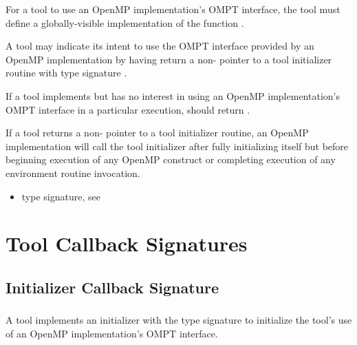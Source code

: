 \descr
For a tool to use an OpenMP implementation's OMPT interface,
the tool must define a globally-visible implementation of the
function .

A tool may indicate its intent to use the OMPT interface provided
by an OpenMP implementation by having
 return a non- pointer to a tool
initializer routine with type signature .

\begin{comment}
If a tool so indicates its interest in OMPT, the OpenMP implementation
will maintain state information for each OpenMP thread and will
perform any OMPT event callbacks registered by the tool.
\end{comment}

If a tool implements  but has no interest in using
an OpenMP implementation's OMPT interface in a particular execution,
 should return . 

\effect
If a tool returns a non- pointer to a tool
initializer routine, an OpenMP implementation will 
call the tool initializer
after fully initializing itself but before
beginning execution of any OpenMP construct
or completing execution of any environment routine invocation. 

\crossreferences
\begin{itemize}
\item {} type signature, see 
\end{itemize}

\section{Tool Callback Signatures}
\subsection{Initializer Callback Signature}

\subsubsection{}
\label{sec:ompt_initialize_fn_t}

\summary
A tool implements an initializer with the type signature
 to initialize the tool's use of
an OpenMP implementation's OMPT interface.

